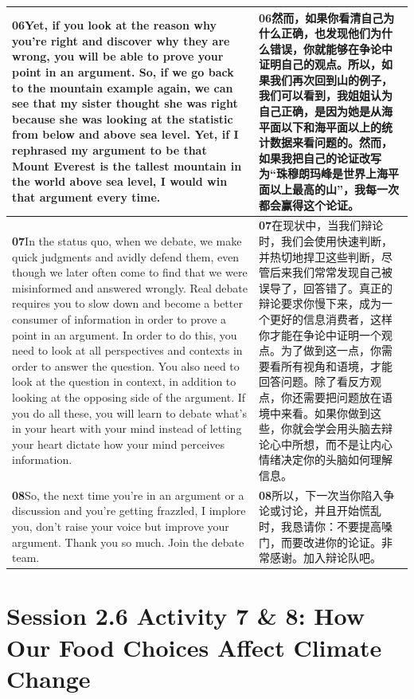 \documentclass[UTF8,zihao=-4,fontset=fandol]{ctexart}
\newcommand{\TranscriptColumn}{\raggedright\arraybackslash\hyphenpenalty=10000\exhyphenpenalty=10000\sloppy}
\begin{document}
\begin{longtable}{>{\TranscriptColumn}p{} >{\TranscriptColumn}p{}}
\textbf{06}\quad Yet, if you look at the reason why you're right and discover why they are wrong, you will be able to prove your point in an argument. So, if we go back to the mountain example again, we can see that my sister thought she was right because she was looking at the statistic from below and above sea level. Yet, if I rephrased my argument to be that Mount Everest is the tallest mountain in the world above sea level, I would win that argument every time. & \textbf{06}\quad 然而，如果你看清自己为什么正确，也发现他们为什么错误，你就能够在争论中证明自己的观点。所以，如果我们再次回到山的例子，我们可以看到，我姐姐认为自己正确，是因为她是从海平面以下和海平面以上的统计数据来看问题的。然而，如果我把自己的论证改写为“珠穆朗玛峰是世界上海平面以上最高的山”，我每一次都会赢得这个论证。 \\ \hline
\textbf{07}\quad In the status quo, when we debate, we make quick judgments and avidly defend them, even though we later often come to find that we were misinformed and answered wrongly. Real debate requires you to slow down and become a better consumer of information in order to prove a point in an argument. In order to do this, you need to look at all perspectives and contexts in order to answer the question. You also need to look at the question in context, in addition to looking at the opposing side of the argument. If you do all these, you will learn to debate what's in your heart with your mind instead of letting your heart dictate how your mind perceives information. & \textbf{07}\quad 在现状中，当我们辩论时，我们会使用快速判断，并热切地捍卫这些判断，尽管后来我们常常发现自己被误导了，回答错了。真正的辩论要求你慢下来，成为一个更好的信息消费者，这样你才能在争论中证明一个观点。为了做到这一点，你需要看所有视角和语境，才能回答问题。除了看反方观点，你还需要把问题放在语境中来看。如果你做到这些，你就会学会用头脑去辩论心中所想，而不是让内心情绪决定你的头脑如何理解信息。 \\ \hline
\textbf{08}\quad So, the next time you're in an argument or a discussion and you're getting frazzled, I implore you, don't raise your voice but improve your argument. Thank you so much. Join the debate team. & \textbf{08}\quad 所以，下一次当你陷入争论或讨论，并且开始慌乱时，我恳请你：不要提高嗓门，而要改进你的论证。非常感谢。加入辩论队吧。 \\ \hline
\end{longtable}


\clearpage
\section{Session 2.6 Activity 7 \& 8: How Our Food Choices Affect Climate Change}
\end{document}
